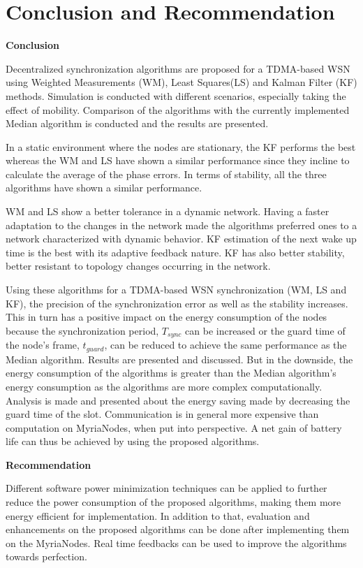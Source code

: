 \documentclass[journal]{IEEEtran}
\begin{document}
\section{\textbf{Conclusion and Recommendation}}\noindent
\textbf{Conclusion}\par
Decentralized synchronization algorithms are proposed for a TDMA-based WSN using Weighted Measurements (WM), Least Squares(LS) and Kalman Filter (KF) methods. Simulation is conducted with different scenarios, especially taking the effect of mobility. Comparison of the algorithms with the currently implemented Median algorithm is conducted and the results are presented.
\par
In a static environment where the nodes are stationary, the KF performs the best whereas the WM and LS have shown a similar performance since they incline to calculate the average of the phase errors. In terms of stability, all the three algorithms have shown a similar performance.
\par
WM and LS show a better tolerance in a dynamic network. Having a
faster adaptation to the changes in the network made the algorithms
preferred ones to a network characterized with dynamic behavior. KF
estimation of the next wake up time is the best with its adaptive feedback nature. KF has also better stability, better
resistant to topology changes occurring in the network.
\par
Using these algorithms for a TDMA-based WSN synchronization (WM, LS and KF), the precision of the synchronization error as well as the stability increases. This in turn has a positive impact on the energy consumption of the nodes because the synchronization period, $T_{sync}$ can be increased or the guard time of the node's frame, $t_{guard}$, can be reduced to achieve the same performance as the Median algorithm. Results are presented and discussed. But in the downside, the energy consumption of the algorithms is greater than the Median algorithm's energy consumption as the algorithms are more complex computationally. Analysis is made and presented about the energy saving made by decreasing the guard time of the slot. Communication is in general more expensive than computation on MyriaNodes, when put into perspective. A net gain of battery life can thus be achieved by using the proposed algorithms.
\par \noindent \textbf{Recommendation} \par Different software power minimization techniques can be applied to further reduce the power consumption of the proposed algorithms, making them more energy efficient for implementation. In addition to that, evaluation and enhancements on the proposed algorithms can be done after implementing them on the MyriaNodes. Real time feedbacks can be used to improve the algorithms towards perfection.
\end{document}
